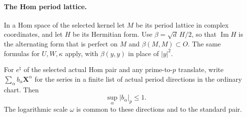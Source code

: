 \paragraph{The Hom period lattice.}
In a Hom space of the selected kernel let \(M\) be its period
lattice in complex coordinates, and let \(H\) be its
Hermitian form. Use
\(\beta=\sqrt d\,H/2\), so that
\(\operatorname{Im}H\) is the alternating form that is
perfect on \(M\) and \(\beta(M,M)\subset O\).
The same formulas for \(U,W,\kappa\) apply, with
\(\beta(y,y)\) in place of \(|y|^2\).
\begin{proposition}\label{prop:word-hom-lattice-integral}
For \(e^\natural\) of the selected actual Hom pair and
any prime-to-\(p\) translate, write \(\sum_\alpha b_\alpha\mathbf X^\alpha\) for the series in a finite list of actual period directions in the ordinary chart. Then
\[
 \sup_\alpha|b_\alpha|_p\le1.
\]
 The logarithmic scale \(\omega\)
is common to these directions and to the standard pair.
\end{proposition}


